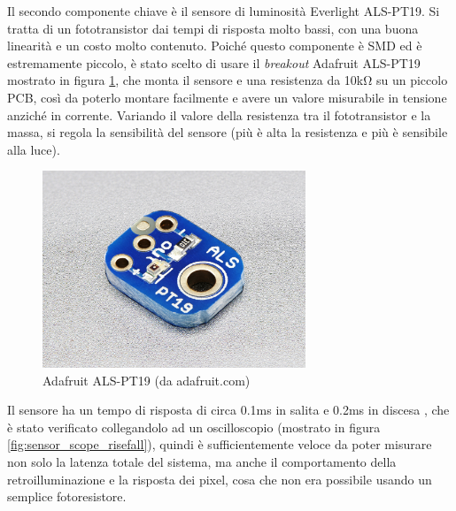 Il secondo componente chiave è il sensore di luminosità Everlight ALS-PT19. Si tratta di un fototransistor dai tempi di risposta molto bassi, con una buona linearità e un costo molto contenuto. Poiché questo componente è SMD ed è estremamente piccolo, è stato scelto di usare il \textit{breakout} Adafruit ALS-PT19 mostrato in figura \ref{fig:adafruit_pt19}, che monta il sensore e una resistenza da 10k\si{\ohm} su un piccolo PCB, così da poterlo montare facilmente e avere un valore misurabile in tensione anziché in corrente. Variando il valore della resistenza tra il fototransistor e la massa, si regola la sensibilità del sensore (più è alta la resistenza e più è sensibile alla luce).
\begin{figure}[h]
	\centering
	\includegraphics[width=0.7\textwidth]{Dispositivo_files/als-pt19.jpg}
	\caption{Adafruit ALS-PT19 (da adafruit.com)}
	\label{fig:adafruit_pt19}
\end{figure}

Il sensore ha un tempo di risposta di circa 0.1ms in salita e 0.2ms in discesa \cite{als_pt19_datasheet}, che è stato verificato collegandolo ad un oscilloscopio (mostrato in figura \ref{fig:sensor_scope_risefall}), quindi è sufficientemente veloce da poter misurare non solo la latenza totale del sistema, ma anche il comportamento della retroilluminazione e la risposta dei pixel, cosa che non era possibile usando un semplice fotoresistore.

